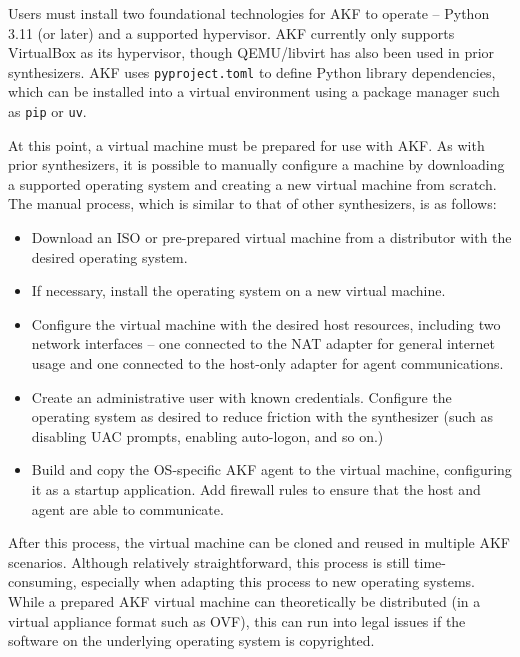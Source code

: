 \documentclass[letterpaper,12pt]{report}
\def\tightlist{}
\newcommand{\passthrough}[1]{#1}
\begin{document}
Users must install two foundational technologies for AKF to operate --
Python 3.11 (or later) and a supported hypervisor. AKF currently only
supports VirtualBox as its hypervisor, though QEMU/libvirt has also been
used in prior synthesizers. AKF uses
\passthrough{\lstinline!pyproject.toml!} to define Python library
dependencies, which can be installed into a virtual environment using a
package manager such as \passthrough{\lstinline!pip!} or
\passthrough{\lstinline!uv!}.

At this point, a virtual machine must be prepared for use with AKF. As
with prior synthesizers, it is possible to manually configure a machine
by downloading a supported operating system and creating a new virtual
machine from scratch. The manual process, which is similar to that of
other synthesizers, is as follows:

\begin{itemize}
\tightlist
\item
  Download an ISO or pre-prepared virtual machine from a distributor
  with the desired operating system.
\item
  If necessary, install the operating system on a new virtual machine.
\item
  Configure the virtual machine with the desired host resources,
  including two network interfaces -- one connected to the NAT adapter
  for general internet usage and one connected to the host-only adapter
  for agent communications.
\item
  Create an administrative user with known credentials. Configure the
  operating system as desired to reduce friction with the synthesizer
  (such as disabling UAC prompts, enabling auto-logon, and so on.)
\item
  Build and copy the OS-specific AKF agent to the virtual machine,
  configuring it as a startup application. Add firewall rules to ensure
  that the host and agent are able to communicate.
\end{itemize}

After this process, the virtual machine can be cloned and reused in
multiple AKF scenarios. Although relatively straightforward, this
process is still time-consuming, especially when adapting this process
to new operating systems. While a prepared AKF virtual machine can
theoretically be distributed (in a virtual appliance format such as
OVF), this can run into legal issues if the software on the underlying
operating system is copyrighted.
\end{document}
